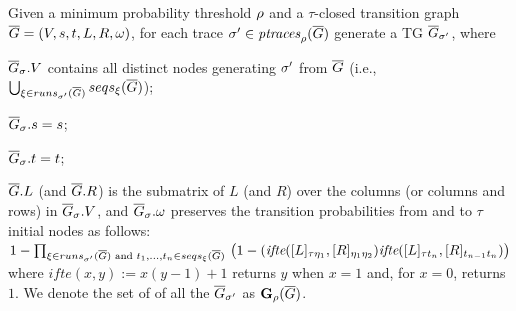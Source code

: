 	\begin{definition}
		Given a minimum probability thre\-shold $\pmin$ and a $\tau$-closed transition graph $\closed{G}=(V,s,t,L,R,\omega)$, for each trace $\nonlogtrace\in\ptraces{\closed{G}}{\pmin}$ generate a TG
$\closed{G}_\nonlogtrace$, where 
\begin{inparaenum}[\it (i)]
	\item $\closed{G}_\sigma.V$ contains all distinct nodes generating $\nonlogtrace$ from $\closed{G}$	(i.e., $\bigcup_{\xi\in\runs{\closed{G}}{\nonlogtrace}}\seqs{ \closed{G}}{\xi}$); 
	\item $\closed{G}_\sigma.s = s$;
	\item  $\closed{G}_\sigma.t = t$; 
	\item $\closed{G}.L$ (and $\closed{G}.R$) is the submatrix of $L$ (and $R$) over the columns (or columns and rows) in $\closed{G}_\sigma.V$, and $\closed{G}_\sigma.\omega$ preserves the transition probabilities from and to $\tau$ initial nodes as follows: $1-\prod_{\xi\in\runs{\closed{G}}{\sigma'}\textup{ and }t_1,\dots,t_n\in\seqs{\closed{G}}{\xi}}\\\left(1-(\textit{ifte}([L]_{\tau\eta_1},[R]_{\eta_1\eta_2})\textit{ifte}([L]_{\tau t_n},[R]_{t_{n-1} t_n})\right)$
	where $\textit{ifte}(x,y):=x(y-1)+1$ returns $y$ when $x=1$ and, for $x=0$, returns $1$. We denote the set of of all the $\closed{G}_\nonlogtrace$ as $\TBf{\pmin}{4}(\closed{G})$.
\end{inparaenum}
%		
	\end{definition}
